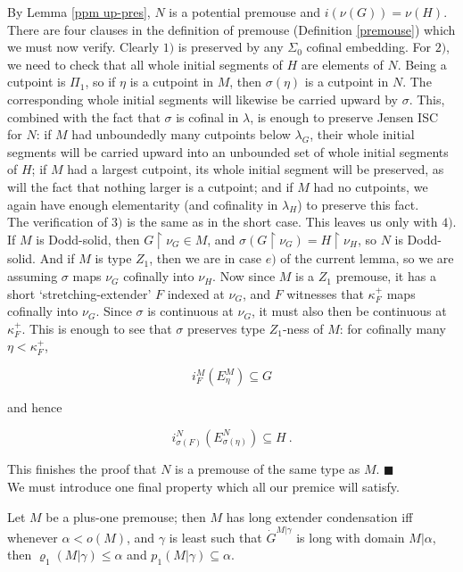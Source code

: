 \documentclass[12pt]{article}
\begin{document}
By Lemma \ref{ppm up-pres}, $N$ is a potential premouse and $i (\nu (G)) = \nu (H)$.  There are four clauses in the definition of premouse (Definition \ref{premouse}) which we must now verify.  Clearly $1)$ is preserved by any $\Sigma_0$ cofinal embedding.  For $2)$, we need to check that all whole initial segments of $H$ are elements of $N$.  Being a cutpoint is $\Pi_1$, so if $\eta$ is a cutpoint in $M$, then $\sigma ( \eta )$ is a cutpoint in $N$.  The corresponding whole initial segments will likewise be carried upward by $\sigma$.  This, combined with the fact that $\sigma$ is cofinal in $\lambda$, is enough to preserve Jensen ISC for $N$: if $M$ had unboundedly many cutpoints below $\lambda_G$, their whole initial segments will be carried upward into an unbounded set of whole initial segments of $H$; if $M$ had a largest cutpoint, its whole initial segment will be preserved, as will the fact that nothing larger is a cutpoint; and if $M$ had no cutpoints, we again have enough elementarity (and cofinality in $\lambda_H$) to preserve this fact.\\


The verification of $3)$ is the same as in the short case.  This leaves us only with $4)$.  If $M$ is Dodd-solid, then $G \restriction \nu_G \in M$, and $\sigma ( G \restriction \nu_G) = H \restriction \nu_H $, so $N$ is Dodd-solid.  And if $M$ is type $Z_1$, then we are in case $e)$ of the current lemma, so we are assuming $\sigma$ maps $\nu_G$ cofinally into $\nu_H$.  Now since $M$ is a $Z_1$ premouse, it has a short `stretching-extender' $F$ indexed at $\nu_G$, and $F$ witnesses that $\kappa_F^+$ maps cofinally into $\nu_G$.  Since $\sigma$ is continuous at $\nu_G$, it must also then be continuous at $\kappa_F^+$.  This is enough to see that $\sigma$ preserves type $Z_1$-ness of $M$: for cofinally many $\eta < \kappa_F^+$,

\[
i_F^M (E_\eta^M ) \subseteq G
\]

and hence

\[
i_{\sigma (F)}^N ( E_{\sigma (\eta )}^N ) \subseteq H \ .
\]

This finishes the proof that $N$ is a premouse of the same type as $M$. $\blacksquare$\\


We must introduce one final property which all our premice will satisfy.\\

\begin{def} \label{LEC}
Let $M$ be a plus-one premouse; then $M$ has long extender condensation iff whenever $\alpha < o(M)$, and $\gamma$ is least such that $\dot{G}^{M | \gamma}$ is long with domain $M | \alpha$, then $\varrho_1 (M | \gamma ) \leq \alpha $ and $p_1 (M | \gamma ) \subseteq \alpha $.
\end{def}
\end{document}

